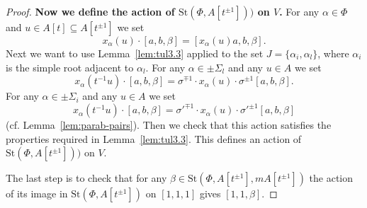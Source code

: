 \documentclass[oneside,12pt]{amsart}
\numberwithin{equation}{section}
\numberwithin{lem}{section}
\theoremstyle{definition}
\theoremstyle{remark}
\newcommand{\Stb}{\mathrm{St}}
\begin{document}
\begin{proof}

{\bf Now we define the action of $\Stb(\Phi,A[t^{\pm 1}]))$ on $V$.} For any $\alpha\in\Phi$ and
$u\in A[t]\subseteq A[t^{\pm 1}]$
we set
$$
x_\alpha(u)\cdot [a,b,\beta]=[x_\alpha(u)a,b,\beta].
$$
Next we want to use Lemma~\ref{lem:tul3.3} applied to the set $J=\{\alpha_i,\alpha_l\}$, where $\alpha_i$
is the simple root adjacent to $\alpha_l$. For any $\alpha\in\pm\Sigma_l$ and any $u\in A$ we set
$$
x_\alpha(t^{-1}u)\cdot [a,b,\beta]=\sigma^{\mp 1}\cdot x_\alpha(u)\cdot\sigma^{\pm 1} [a,b,\beta].
$$
For any $\alpha\in\pm\Sigma_i$ and any $u\in A$ we set
$$
x_\alpha(t^{-1}u)\cdot [a,b,\beta]={\sigma'}^{\mp 1}\cdot x_\alpha(u)\cdot{\sigma'}^{\pm 1} [a,b,\beta]
$$
(cf. Lemma~\ref{lem:parab-pairs}). Then we check that this action satisfies the properties required
in Lemma~\ref{lem:tul3.3}. This defines an action of $\Stb(\Phi,A[t^{\pm 1}]))$ on $V$.

The last step is to check that for any $\beta\in \Stb(\Phi,A[t^{\pm 1}],mA[t^{\pm 1}])$ the action of
its image in $\Stb(\Phi,A[t^{\pm 1}])$ on $[1,1,1]$ gives $[1,1,\beta]$.
\end{proof}
\end{document}
